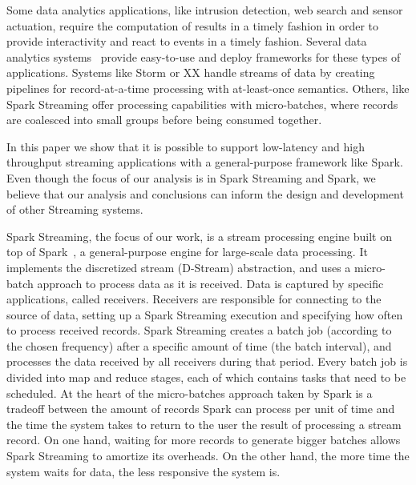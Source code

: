 \noindent

Some data analytics applications, like intrusion detection, web search and sensor actuation,
require the computation of results in a timely fashion in order to provide interactivity and react to events in a timely fashion.
Several data analytics systems~\cite{Babu:2001:CQO:603867.603884,TelegraphCQ,Storm,SparkStreaming,Trill,Naiad,Niagara,StreamInsight,Carney:2002:MSN:1287369.1287389,Sullivan:1998:TSM:1268256.1268258,Condie:2010:MO:1855711.185573,Brito:2011:SLD:2114498.2116192} provide easy-to-use and deploy frameworks for these types of applications. 
Systems like Storm or XX  handle streams of data by creating pipelines for record-at-a-time processing with at-least-once semantics. 
Others, like Spark Streaming offer processing capabilities with micro-batches, where records are coalesced into small groups before being consumed together.

In this paper we show that it is possible to support low-latency and high throughput streaming applications with a general-purpose framework like Spark.
Even though the focus of our analysis is in Spark Streaming and Spark, we believe that our analysis and conclusions can inform the design and development of other Streaming systems.


%
%
Spark Streaming, the focus of our work, is a stream processing engine built on top of Spark~\cite{Spark}, a general-purpose engine for large-scale data processing. It implements the discretized stream (D-Stream) abstraction, and uses a micro-batch approach to process data as it is received. Data is captured by specific applications, called receivers. Receivers are responsible for connecting to the source of data, setting up a Spark Streaming execution and specifying how often to process received records. Spark Streaming creates a batch job (according to the chosen frequency) after a specific amount of time (the batch interval), and processes the data received by all receivers during that period. Every batch job is divided into map and reduce stages, each of which contains tasks that need to be scheduled.
At the heart of the micro-batches approach taken by Spark is a tradeoff between the amount of records Spark can process per unit of time and the time the system takes to return to the user the result of processing a stream record. On one hand, waiting for more records to generate bigger batches allows Spark Streaming to amortize its overheads. On the other hand, the more time the system waits for data, the less responsive the system is.

